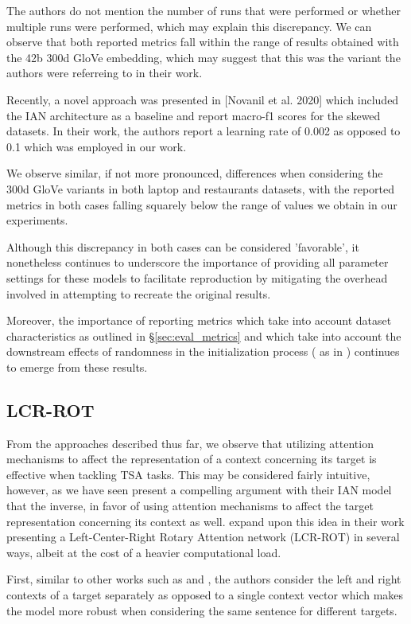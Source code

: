 \documentclass[../../fyp.tex]{subfiles}
\begin{document}
The authors do not mention the number of runs that were performed or whether multiple runs were performed, which may explain this discrepancy. We can observe that both reported metrics fall within the range of results obtained with the 42b 300d GloVe embedding, which may suggest that this was the variant the authors were referreing to in their work. 

Recently, a novel approach was presented in [Novanil et al. 2020] which included the IAN architecture as a baseline and report macro-f1 scores for the skewed datasets. In their work, the authors report a learning rate of 0.002 as opposed to 0.1 which was employed in our work. 

We observe similar, if not more pronounced, differences when considering the 300d GloVe variants in both laptop and restaurants datasets, with the reported metrics in both cases falling squarely below the range of values we obtain in our experiments. 

Although this discrepancy in both cases can be considered 'favorable', it nonetheless continues to underscore the importance of providing all parameter settings for these models to facilitate reproduction by mitigating the overhead involved in attempting to recreate the original results. 

Moreover, the importance of reporting metrics which take into account dataset characteristics as outlined in \S\ref{sec:eval_metrics} and which take into account the downstream effects of randomness in the initialization process (\cite{reimers2017} as in \cite{moore2018}) continues to emerge from these results. 

\subsection{LCR-ROT}
From the approaches described thus far, we observe that utilizing attention mechanisms to affect the representation of a context concerning its target is effective when tackling TSA tasks. This may be considered fairly intuitive, however, as we have seen \cite{dehongma2017} present a compelling argument with their IAN model that the inverse, in favor of using attention mechanisms to affect the target representation concerning its context as well. \cite{zheng2018} expand upon this idea in their work presenting a Left-Center-Right Rotary Attention network (LCR-ROT) in several ways, albeit at the cost of a heavier computational load. 

First, similar to other works such as \cite{tang2016} and \cite{chen2017}, the authors consider the left and right contexts of a target separately as opposed to a single context vector which makes the model more robust when considering the same sentence for different targets. 
\end{document}
